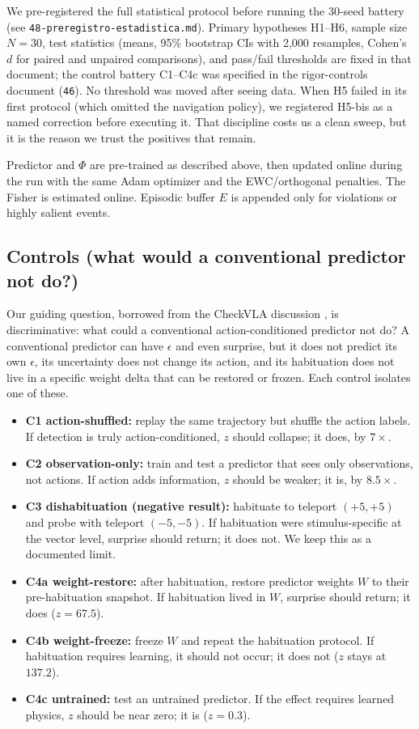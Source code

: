 \documentclass[11pt,a4paper]{article}
\begin{document}
We pre-registered the full statistical protocol before running the 30-seed battery (see \texttt{48-preregistro-estadistica.md}). Primary hypotheses H1--H6, sample size $N=30$, test statistics (means, 95\% bootstrap CIs with 2,000 resamples, Cohen's $d$ for paired and unpaired comparisons), and pass/fail thresholds are fixed in that document; the control battery C1--C4c was specified in the rigor-controls document (\texttt{46}). No threshold was moved after seeing data. When H5 failed in its first protocol (which omitted the navigation policy), we registered H5-bis as a named correction before executing it. That discipline costs us a clean sweep, but it is the reason we trust the positives that remain.

Predictor and $\Phi$ are pre-trained as described above, then updated online during the run with the same Adam optimizer and the EWC/orthogonal penalties. The Fisher is estimated online. Episodic buffer $E$ is appended only for violations or highly salient events.

\subsection{Controls (what would a conventional predictor not do?)}

Our guiding question, borrowed from the CheckVLA discussion \cite{checkvla2026}, is discriminative: what could a conventional action-conditioned predictor not do? A conventional predictor can have $\epsilon$ and even surprise, but it does not predict its own $\epsilon$, its uncertainty does not change its action, and its habituation does not live in a specific weight delta that can be restored or frozen. Each control isolates one of these.

\begin{itemize}[leftmargin=1.2em]
    \item \textbf{C1 action-shuffled:} replay the same trajectory but shuffle the action labels. If detection is truly action-conditioned, $z$ should collapse; it does, by $7\times$.
    \item \textbf{C2 observation-only:} train and test a predictor that sees only observations, not actions. If action adds information, $z$ should be weaker; it is, by $8.5\times$.
    \item \textbf{C3 dishabituation (negative result):} habituate to teleport $(+5,+5)$ and probe with teleport $(-5,-5)$. If habituation were stimulus-specific at the vector level, surprise should return; it does not. We keep this as a documented limit.
    \item \textbf{C4a weight-restore:} after habituation, restore predictor weights $W$ to their pre-habituation snapshot. If habituation lived in $W$, surprise should return; it does ($z=67.5$).
    \item \textbf{C4b weight-freeze:} freeze $W$ and repeat the habituation protocol. If habituation requires learning, it should not occur; it does not ($z$ stays at $137.2$).
    \item \textbf{C4c untrained:} test an untrained predictor. If the effect requires learned physics, $z$ should be near zero; it is ($z=0.3$).
\end{itemize}
\end{document}
